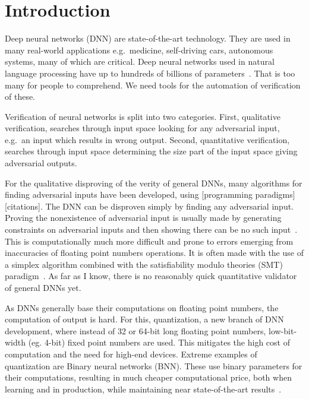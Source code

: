 \documentclass{fithesis}
\begin{document}
\chapter{Introduction}


Deep neural networks (DNN) are state-of-the-art technology. They are used in many
real-world applications e.g.\ medicine, self-driving cars, autonomous systems,
many of which are critical. %
Deep neural networks used in natural language processing have up to hundreds of
billions of parameters~\cite{2021arXiv210901652W}.
That is too many for people to comprehend. We need tools for the automation
of verification of these.

Verification of neural networks is split into two categories. First,
qualitative verification, searches through input space looking for any
adversarial input, e.g.\ an input which results in wrong output.
Second, quantitative verification, searches through input space
determining the size part of the input space giving adversarial outputs.

For the qualitative disproving of the verity of general DNNs,
many algorithms for finding adversarial
inputs have been developed, using [programming paradigms][citations].
The DNN can be disproven simply by finding any adversarial input.
Proving the nonexistence of adversarial input is usually made by generating constraints
on adversarial inputs and then showing there can be no such
input~\cite{Isac2022NeuralNV}. This is computationally much more difficult
and prone to errors emerging from inaccuracies of floating point numbers operations.
It is often made with the use of a simplex algorithm combined with 
the satisfiability modulo theories (SMT) paradigm~\cite{Isac2022NeuralNV, marabou2019, reluplex2017}.
As far as I know, there is no reasonably quick quantitative
validator of general DNNs yet.

As DNNs generally base their computations on floating point numbers,
the computation of output is hard. For this, quantization,
a new branch of DNN development, where instead of 32 or 64-bit long floating
point numbers, low-bit-width (eg. 4-bit) fixed point numbers are used.
This mitigates the high cost of computation and the need for high-end devices.
Extreme examples of quantization are Binary neural networks (BNN).
These use binary parameters for their computations, resulting in much
cheaper computational price, both when learning and in production,
while maintaining near state-of-the-art results~\cite{Agrawal2023}.
\end{document}
